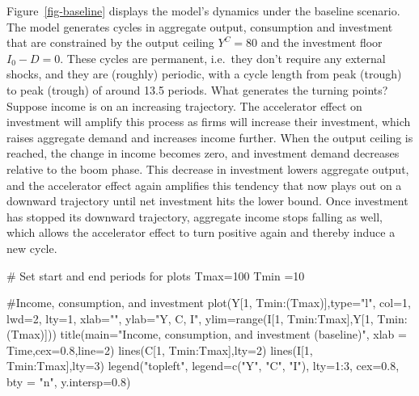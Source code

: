\documentclass[
  letterpaper,
  DIV=11,
  numbers=noendperiod]{scrreprt}
\newenvironment{Shaded}{\begin{snugshade}}{\end{snugshade}}
\newcommand{\AttributeTok}[1]{\textcolor[rgb]{0.40,0.45,0.13}{#1}}
\newcommand{\CommentTok}[1]{\textcolor[rgb]{0.37,0.37,0.37}{#1}}
\newcommand{\DecValTok}[1]{\textcolor[rgb]{0.68,0.00,0.00}{#1}}
\newcommand{\FloatTok}[1]{\textcolor[rgb]{0.68,0.00,0.00}{#1}}
\newcommand{\FunctionTok}[1]{\textcolor[rgb]{0.28,0.35,0.67}{#1}}
\newcommand{\NormalTok}[1]{\textcolor[rgb]{0.00,0.23,0.31}{#1}}
\newcommand{\OtherTok}[1]{\textcolor[rgb]{0.00,0.23,0.31}{#1}}
\newcommand{\SpecialCharTok}[1]{\textcolor[rgb]{0.37,0.37,0.37}{#1}}
\newcommand{\StringTok}[1]{\textcolor[rgb]{0.13,0.47,0.30}{#1}}
\begin{document}
Figure~\ref{fig-baseline} displays the model's dynamics under the
baseline scenario. The model generates cycles in aggregate output,
consumption and investment that are constrained by the output ceiling
\(Y^C=80\) and the investment floor \(I_0-D=0\). These cycles are
permanent, i.e.~they don't require any external shocks, and they are
(roughly) periodic, with a cycle length from peak (trough) to peak
(trough) of around 13.5 periods. What generates the turning points?
Suppose income is on an increasing trajectory. The accelerator effect on
investment will amplify this process as firms will increase their
investment, which raises aggregate demand and increases income further.
When the output ceiling is reached, the change in income becomes zero,
and investment demand decreases relative to the boom phase. This
decrease in investment lowers aggregate output, and the accelerator
effect again amplifies this tendency that now plays out on a downward
trajectory until net investment hits the lower bound. Once investment
has stopped its downward trajectory, aggregate income stops falling as
well, which allows the accelerator effect to turn positive again and
thereby induce a new cycle.

\begin{Shaded}
\begin{Highlighting}[]
\CommentTok{\# Set start and end periods for plots}
\NormalTok{Tmax}\OtherTok{=}\DecValTok{100}
\NormalTok{Tmin }\OtherTok{=}\DecValTok{10}

\CommentTok{\#Income, consumption, and investment}
\FunctionTok{plot}\NormalTok{(Y[}\DecValTok{1}\NormalTok{, Tmin}\SpecialCharTok{:}\NormalTok{(Tmax)],}\AttributeTok{type=}\StringTok{"l"}\NormalTok{, }\AttributeTok{col=}\DecValTok{1}\NormalTok{, }\AttributeTok{lwd=}\DecValTok{2}\NormalTok{, }\AttributeTok{lty=}\DecValTok{1}\NormalTok{, }\AttributeTok{xlab=}\StringTok{""}\NormalTok{, }\AttributeTok{ylab=}\StringTok{"Y, C, I"}\NormalTok{, }\AttributeTok{ylim=}\FunctionTok{range}\NormalTok{(I[}\DecValTok{1}\NormalTok{, Tmin}\SpecialCharTok{:}\NormalTok{Tmax],Y[}\DecValTok{1}\NormalTok{, Tmin}\SpecialCharTok{:}\NormalTok{(Tmax)]))}
\FunctionTok{title}\NormalTok{(}\AttributeTok{main=}\StringTok{"Income, consumption, and investment (baseline)"}\NormalTok{, }\AttributeTok{xlab =} \StringTok{\textquotesingle{}Time\textquotesingle{}}\NormalTok{,}\AttributeTok{cex=}\FloatTok{0.8}\NormalTok{,}\AttributeTok{line=}\DecValTok{2}\NormalTok{)}
\FunctionTok{lines}\NormalTok{(C[}\DecValTok{1}\NormalTok{, Tmin}\SpecialCharTok{:}\NormalTok{Tmax],}\AttributeTok{lty=}\DecValTok{2}\NormalTok{)}
\FunctionTok{lines}\NormalTok{(I[}\DecValTok{1}\NormalTok{, Tmin}\SpecialCharTok{:}\NormalTok{Tmax],}\AttributeTok{lty=}\DecValTok{3}\NormalTok{)}
\FunctionTok{legend}\NormalTok{(}\StringTok{"topleft"}\NormalTok{, }\AttributeTok{legend=}\FunctionTok{c}\NormalTok{(}\StringTok{"Y"}\NormalTok{, }\StringTok{"C"}\NormalTok{, }\StringTok{"I"}\NormalTok{),}
       \AttributeTok{lty=}\DecValTok{1}\SpecialCharTok{:}\DecValTok{3}\NormalTok{, }\AttributeTok{cex=}\FloatTok{0.8}\NormalTok{, }\AttributeTok{bty =} \StringTok{"n"}\NormalTok{, }\AttributeTok{y.intersp=}\FloatTok{0.8}\NormalTok{)}
\end{Highlighting}
\end{Shaded}
\end{document}
